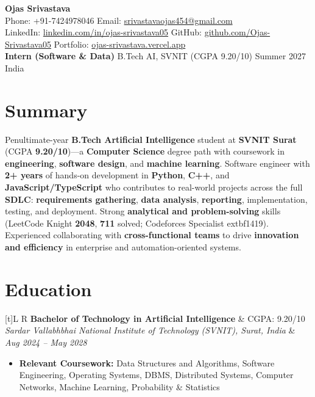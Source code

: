 \documentclass[a4paper,10pt]{article}
\newcommand{\resumeSubheading}[4]{
  \vspace{0.5mm}
  \noindent
  \begin{tabularx}{\textwidth}[t]{L R}
    \textbf{#1} & #4 \\
    \textit{#3} & \textit{#2} \\
  \end{tabularx}
  \vspace{-0.5mm}
}
\begin{document}
\selectfont

\begin{center}
  {\LARGE \textbf{Ojas Srivastava}} \\[1mm]
  \small
  Phone: +91-7424978046 \textbar{}
  Email: \href{mailto:srivastavaojas454@gmail.com}{srivastavaojas454@gmail.com} \\[0.5mm]
  LinkedIn: \href{https://linkedin.com/in/ojas-srivastava05}{linkedin.com/in/ojas-srivastava05} \textbar{}
  GitHub: \href{https://github.com/Ojas-Srivastava05}{github.com/Ojas-Srivastava05} \textbar{}
  Portfolio: \href{https://ojas-srivastava.vercel.app}{ojas-srivastava.vercel.app} \\[0.5mm]
  \textbf{Intern (Software \& Data)} \textbar{} B.Tech AI, SVNIT (CGPA 9.20/10) \textbar{} Summer 2027 \textbar{} India
\end{center}

\vspace{-1mm}

\section{Summary}
\small
Penultimate-year \textbf{B.Tech Artificial Intelligence} student at \textbf{SVNIT Surat} (CGPA \textbf{9.20/10})---a \textbf{Computer Science} degree path with coursework in \textbf{engineering}, \textbf{software design}, and \textbf{machine learning}. Software engineer with \textbf{2+ years} of hands-on development in \textbf{Python}, \textbf{C++}, and \textbf{JavaScript/TypeScript} who contributes to real-world projects across the full \textbf{SDLC}: \textbf{requirements gathering}, \textbf{data analysis}, \textbf{reporting}, implementation, testing, and deployment. Strong \textbf{analytical and problem-solving} skills (LeetCode Knight \textbf{2048}, \textbf{711} solved; Codeforces Specialist 	extbf{1419}). Experienced collaborating with \textbf{cross-functional teams} to drive \textbf{innovation and efficiency} in enterprise and automation-oriented systems.

\section{Education}
\small
\resumeSubheading
  {Bachelor of Technology in Artificial Intelligence}{Aug 2024 -- May 2028}
  {Sardar Vallabhbhai National Institute of Technology (SVNIT), Surat, India}{CGPA: 9.20/10}
\begin{itemize}
  \item \textbf{Relevant Coursework:} Data Structures and Algorithms, Software Engineering, Operating Systems, DBMS, Distributed Systems, Computer Networks, Machine Learning, Probability \& Statistics
\end{itemize}
\end{document}

